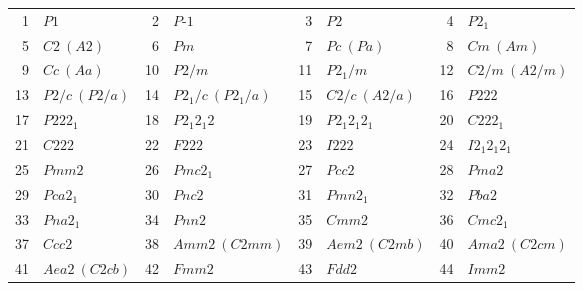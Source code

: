 \documentclass[12pt]{article}
\begin{document}
\begin{center}
{\scriptsize
\begin{tabular}{|r|l||r|l||r|l||r|l|}
\hline
   1 & $P1$                                   &   2 & $P\mbox{-}1$                           &   3 & $P2$                                   &   4 & $P2_{1}$                               \\
   5 & $C2\ (A2)$\footnotemark[1]             &   6 & $Pm$                                   &   7 & $Pc\ (Pa)$\footnotemark[1]             &   8 & $Cm\ (Am)$\footnotemark[1]             \\
   9 & $Cc\ (Aa)$\footnotemark[1]             &  10 & $P2/m$                                 &  11 & $P2_{1}/m$                             &  12 & $C2/m\ (A2/m)$\footnotemark[1]         \\
  13 & $P2/c\ (P2/a)$\footnotemark[1]         &  14 & $P2_{1}/c\ (P2_{1}/a)$\footnotemark[1] &  15 & $C2/c\ (A2/a)$\footnotemark[1]         &  16 & $P222$                                 \\
  17 & $P222_{1}$                             &  18 & $P2_{1}2_{1}2$                         &  19 & $P2_{1}2_{1}2_{1}$                     &  20 & $C222_{1}$                             \\
  21 & $C222$                                 &  22 & $F222$                                 &  23 & $I222$                                 &  24 & $I2_{1}2_{1}2_{1}$                     \\
  25 & $Pmm2$                                 &  26 & $Pmc2_{1}$                             &  27 & $Pcc2$                                 &  28 & $Pma2$                                 \\
  29 & $Pca2_{1}$                             &  30 & $Pnc2$                                 &  31 & $Pmn2_{1}$                             &  32 & $Pba2$                                 \\
  33 & $Pna2_{1}$                             &  34 & $Pnn2$                                 &  35 & $Cmm2$                                 &  36 & $Cmc2_{1}$                             \\
  37 & $Ccc2$                                 &  38 & $Amm2\ (C2mm)$\footnotemark[1]         &  39 & $Aem2\ (C2mb)$\footnotemark[1]         &  40 & $Ama2\ (C2cm)$\footnotemark[1]         \\
  41 & $Aea2\ (C2cb)$\footnotemark[1]         &  42 & $Fmm2$                                 &  43 & $Fdd2$                                 &  44 & $Imm2$                                 \\

\end{tabular}}
\end{center}
\end{document}

